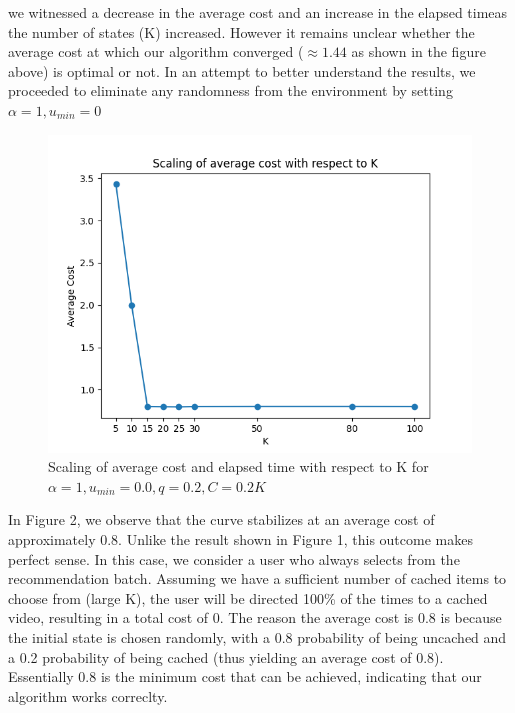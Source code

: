 \documentclass[12pt]{article}
\begin{document}
 we witnessed a decrease in the average cost and an increase in the elapsed timeas the number of states (K) increased. However it remains unclear whether the average cost at which our algorithm converged ($\approx 1.44$ as shown in the figure above) is optimal or not. 
In an attempt to better understand the results, we proceeded to eliminate any randomness from the environment by setting $\alpha = 1, u_{min} = 0$
\begin{figure}[H]
    \centering
    \includegraphics[scale = 0.5]{Figure_21.png}
    
    \caption{Scaling of average cost and elapsed time with respect to K for $\alpha = 1, u_{min} = 0.0, q=0.2,C=0.2K$}
\end{figure}
In Figure 2, we observe that the curve stabilizes at an average cost of approximately 0.8.
 Unlike the result shown in Figure 1, this outcome makes perfect sense. In this case, we consider a user
  who always selects from the recommendation batch. Assuming we have a sufficient number of cached items
   to choose from (large K), the user will be directed 100\% of the times to a cached video, resulting in 
   a total cost of 0. The reason the average cost is 0.8 is because the initial state is chosen randomly, 
   with a 0.8 probability of being uncached and a 0.2 probability of being cached (thus yielding an average cost of 0.8). 
   Essentially 0.8 is the minimum cost that can be achieved, indicating that our algorithm works correclty.
\end{document}
